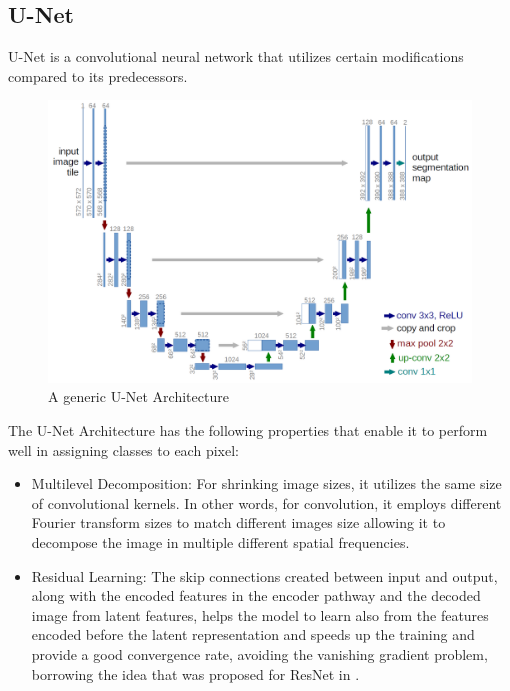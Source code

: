 \documentclass{IEEEtran}
\begin{document}
\subsection{U-Net}
U-Net is a convolutional neural network that utilizes certain modifications compared to its predecessors. 

\begin{figure}[h]
\centering
\includegraphics[width=\textwidth]{img/u-net-architecture.png}
\caption{A generic U-Net Architecture}\label{fig:unet}
\end{figure}

\vfill\null\newpage
The U-Net Architecture has the following properties that enable it to perform well in assigning classes to each pixel: 

\begin{itemize}
    \item Multilevel Decomposition: For shrinking image sizes,  it utilizes the same size of convolutional kernels. In other words, for convolution, it employs different Fourier transform sizes to match different images size allowing it to decompose the image in multiple different spatial frequencies. 
    \item Residual Learning: The skip connections created between input and output, along with the encoded features in the encoder pathway and the decoded image from latent features, helps the model to learn also from the features encoded before the latent representation and speeds up the training and provide a good convergence rate, avoiding the vanishing gradient problem, borrowing the idea that was proposed for ResNet in \cite{he2016deep}. 
\end{itemize}
\end{document}
